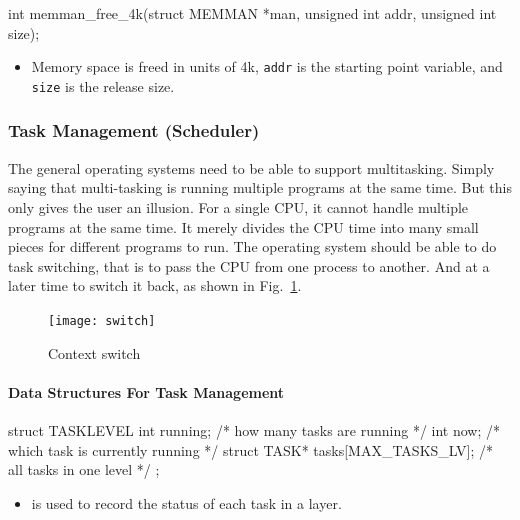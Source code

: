 \documentclass{swfcthesis}
\begin{document}
\begin{ccode}
int memman_free_4k(struct MEMMAN *man, unsigned int addr, unsigned int size);
\end{ccode}
\begin{itemize}
\item Memory space is freed in units of 4k, \texttt{addr} is the starting
  point variable, and \texttt{size} is the release size.
\end{itemize}

\subsubsection{Task Management (Scheduler)}
\label{sec:task-management}

The general operating systems need to be able to support multitasking. Simply saying that
multi-tasking is running multiple programs at the same time. But this only gives the user
an illusion. For a single CPU, it cannot handle multiple programs at the same time. It
merely divides the CPU time into many small pieces for different programs to run. The
operating system should be able to do task switching, that is to pass the CPU from one
process to another. And at a later time to switch it back, as shown in
Fig.~\ref{fig:ctxt-switch}. 

\begin{figure}
  \centering
  \begin{center}
    \texttt{[image: switch]}
  \end{center}
  \caption{Context switch}
  \label{fig:ctxt-switch}
\end{figure}

\paragraph{Data Structures For Task Management}

\begin{codeblock}[1]
\begin{ccode}
struct TASKLEVEL
{ 
  int running; /* how many tasks are running */
  int now;     /* which task is currently running */
  struct TASK* tasks[MAX_TASKS_LV]; /* all tasks in one level */
};
\end{ccode}
\end{codeblock}
\begin{itemize}
\item is used to record the status of each task in a layer.
\end{itemize}
\end{document}
